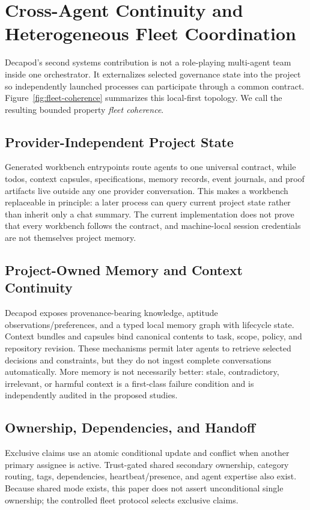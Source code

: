 \section{Cross-Agent Continuity and Heterogeneous Fleet Coordination}
\label{sec:fleet}

Decapod's second systems contribution is not a role-playing multi-agent team inside one orchestrator. It externalizes selected governance state into the project so independently launched processes can participate through a common contract. Figure~\ref{fig:fleet-coherence} summarizes this local-first topology. We call the resulting bounded property \emph{fleet coherence}.



\subsection{Provider-Independent Project State}
Generated workbench entrypoints route agents to one universal contract, while todos, context capsules, specifications, memory records, event journals, and proof artifacts live outside any one provider conversation. This makes a workbench replaceable in principle: a later process can query current project state rather than inherit only a chat summary. The current implementation does not prove that every workbench follows the contract, and machine-local session credentials are not themselves project memory.

\subsection{Project-Owned Memory and Context Continuity}
Decapod exposes provenance-bearing knowledge, aptitude observations/preferences, and a typed local memory graph with lifecycle state. Context bundles and capsules bind canonical contents to task, scope, policy, and repository revision. These mechanisms permit later agents to retrieve selected decisions and constraints, but they do not ingest complete conversations automatically. More memory is not necessarily better: stale, contradictory, irrelevant, or harmful context is a first-class failure condition and is independently audited in the proposed studies.

\subsection{Ownership, Dependencies, and Handoff}
Exclusive claims use an atomic conditional update and conflict when another primary assignee is active. Trust-gated shared secondary ownership, category routing, tags, dependencies, heartbeat/presence, and agent expertise also exist. Because shared mode exists, this paper does not assert unconditional single ownership; the controlled fleet protocol selects exclusive claims.

